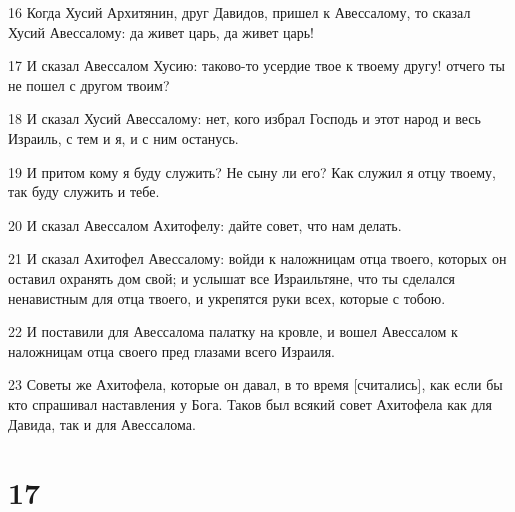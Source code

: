 \par 16 Когда Хусий Архитянин, друг Давидов, пришел к Авессалому, то сказал Хусий Авессалому: да живет царь, да живет царь!
\par 17 И сказал Авессалом Хусию: таково-то усердие твое к твоему другу! отчего ты не пошел с другом твоим?
\par 18 И сказал Хусий Авессалому: нет, кого избрал Господь и этот народ и весь Израиль, с тем и я, и с ним останусь.
\par 19 И притом кому я буду служить? Не сыну ли его? Как служил я отцу твоему, так буду служить и тебе.
\par 20 И сказал Авессалом Ахитофелу: дайте совет, что нам делать.
\par 21 И сказал Ахитофел Авессалому: войди к наложницам отца твоего, которых он оставил охранять дом свой; и услышат все Израильтяне, что ты сделался ненавистным для отца твоего, и укрепятся руки всех, которые с тобою.
\par 22 И поставили для Авессалома палатку на кровле, и вошел Авессалом к наложницам отца своего пред глазами всего Израиля.
\par 23 Советы же Ахитофела, которые он давал, в то время [считались], как если бы кто спрашивал наставления у Бога. Таков был всякий совет Ахитофела как для Давида, так и для Авессалома.

\chapter{17}

